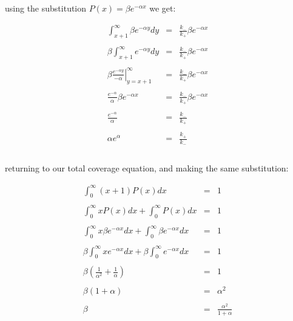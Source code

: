 using the substitution $P(x) = \beta e^{-\alpha x}$ we get: \bigskip

\begin{eqnarray*}
								  \int_{x + 1}^{\infty} \beta e^{-\alpha y} dy & = & \frac{k_{-}}{k_{+}} \beta e^{-\alpha x} \\\\
								  \beta \int_{x + 1}^{\infty} e^{-\alpha y} dy & = & \frac{k_{-}}{k_{+}} \beta e^{-\alpha x} \\\\
	\beta \left. \frac{ e^{-\alpha y} }{- \alpha} \right|_{y = x + 1}^{\infty} & = & \frac{k_{-}}{k_{+}} \beta e^{-\alpha x} \\\\
							  \frac{ e^{-\alpha} }{\alpha} \beta e^{-\alpha x} & = & \frac{k_{-}}{k_{+}} \beta e^{-\alpha x} \\\\
												  \frac{ e^{-\alpha} }{\alpha} & = & \frac{k_{-}}{k_{+}} \\\\
															 \alpha e^{\alpha} & = & \frac{k_{+}}{k_{-}} \\\\
\end{eqnarray*}\medskip

returning to our total coverage equation, and making the same substitution: \bigskip

\begin{eqnarray*}
														\int_{0}^{\infty} (x + 1) P(x) dx & = & 1 \\\\
								  \int_{0}^{\infty} x P(x) dx + \int_{0}^{\infty} P(x) dx & = & 1 \\\\
	\int_{0}^{\infty} x \beta e^{-\alpha x} dx + \int_{0}^{\infty} \beta e^{-\alpha x} dx & = & 1 \\\\
	\beta \int_{0}^{\infty} x e^{-\alpha x} dx + \beta \int_{0}^{\infty} e^{-\alpha x} dx & = & 1 \\\\
								\beta \left(\frac{1}{\alpha^2} + \frac{1}{\alpha} \right) & = & 1 \\\\
																	   \beta (1 + \alpha) & = & \alpha^2 \\\\
																					\beta & = & \frac{\alpha^2}{1 + \alpha} 
\end{eqnarray*}\medskip

